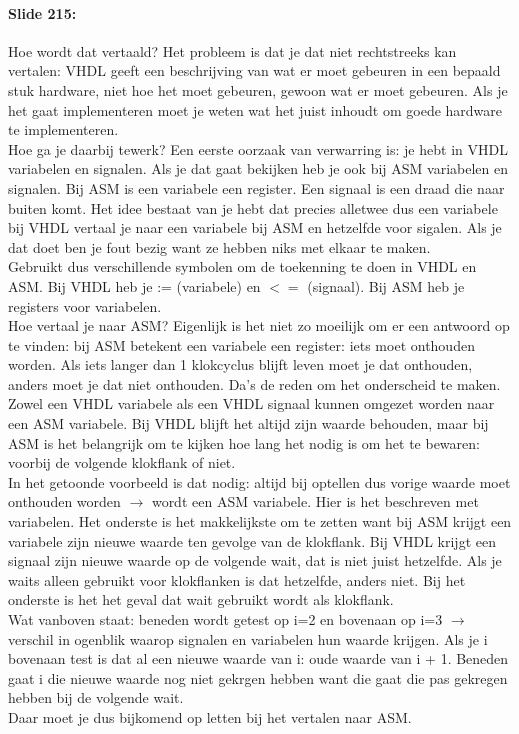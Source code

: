 \documentclass[10pt,a4paper]{book}
\begin{document}
\paragraph{Slide 215:} Hoe wordt dat vertaald? Het probleem is dat je dat niet rechtstreeks kan vertalen: VHDL geeft een beschrijving van wat er moet gebeuren in een bepaald stuk hardware, niet hoe het moet gebeuren, gewoon wat er moet gebeuren. Als je het gaat implementeren moet je weten wat het juist inhoudt om goede hardware te implementeren.\\
Hoe ga je daarbij tewerk? Een eerste oorzaak van verwarring is: je hebt in VHDL variabelen en signalen. Als je dat gaat bekijken heb je ook bij ASM variabelen en signalen. Bij ASM is een variabele een register. Een signaal is een draad die naar buiten komt. Het idee bestaat van je hebt dat precies alletwee dus een variabele bij VHDL vertaal je naar een variabele bij ASM en hetzelfde voor sigalen. Als je dat doet ben je fout bezig want ze hebben niks met elkaar te maken.\\
Gebruikt dus verschillende symbolen om de toekenning te doen in VHDL en ASM. Bij VHDL heb je := (variabele) en $<=$ (signaal). Bij ASM heb je registers voor variabelen.\\ %
Hoe vertaal je naar ASM? Eigenlijk is het niet zo moeilijk om er een antwoord op te vinden: bij ASM betekent een variabele een register: iets moet onthouden worden. Als iets langer dan 1 klokcyclus blijft leven moet je dat onthouden, anders moet je dat niet onthouden. Da's de reden om het onderscheid te maken. Zowel een VHDL variabele als een VHDL signaal kunnen omgezet worden naar een ASM variabele. Bij VHDL blijft het altijd zijn waarde behouden, maar bij ASM is het belangrijk om te kijken hoe lang het nodig is om het te bewaren: voorbij de volgende klokflank of niet.\\
In het getoonde voorbeeld is dat nodig: altijd bij optellen dus vorige waarde moet onthouden worden $\rightarrow$ wordt een ASM variabele. Hier is het beschreven met variabelen. Het onderste is het makkelijkste om te zetten want bij ASM krijgt een variabele zijn nieuwe waarde ten gevolge van de klokflank. Bij VHDL krijgt een signaal zijn nieuwe waarde op de volgende wait, dat is niet juist hetzelfde. Als je waits alleen gebruikt voor klokflanken is dat hetzelfde, anders niet. Bij het onderste is het het geval dat wait gebruikt wordt als klokflank.\\
Wat vanboven staat: beneden wordt getest op i=2 en bovenaan op i=3 $\rightarrow$ verschil in ogenblik waarop signalen en variabelen hun waarde krijgen. Als je i bovenaan test is dat al een nieuwe waarde van i: oude waarde van i + 1. Beneden gaat i die nieuwe waarde nog niet gekrgen hebben want die gaat die pas gekregen hebben bij de volgende wait.\\
Daar moet je dus bijkomend op letten bij het vertalen naar ASM.
\end{document}

